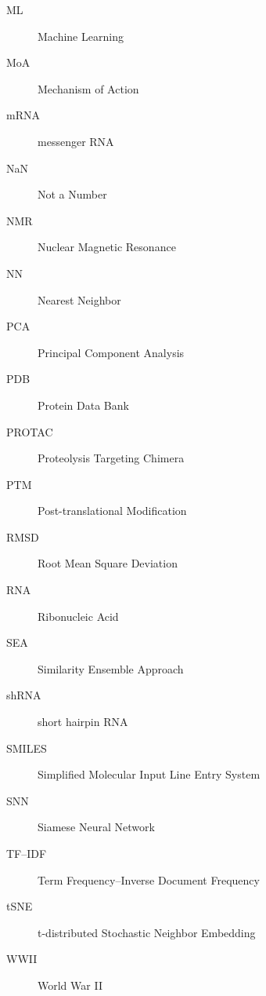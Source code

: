 \begin{description}
    \item[ML] Machine Learning
    \item[MoA] Mechanism of Action
    \item[mRNA] messenger RNA
    \item[NaN] Not a Number
    \item[NMR] Nuclear Magnetic Resonance
    \item[NN] Nearest Neighbor
    \item[PCA] Principal Component Analysis
    \item[PDB] Protein Data Bank
    \item[PROTAC] Proteolysis Targeting Chimera
    \item[PTM] Post-translational Modification
    \item[RMSD] Root Mean Square Deviation
    \item[RNA] Ribonucleic Acid
    \item[SEA] Similarity Ensemble Approach
    \item[shRNA] short hairpin RNA
    \item[SMILES] Simplified Molecular Input Line Entry System
    \item[SNN] Siamese Neural Network
    \item[TF–IDF] Term Frequency–Inverse Document Frequency
    \item[tSNE] t-distributed Stochastic Neighbor Embedding
    \item[WWII] World War II
\end{description}

